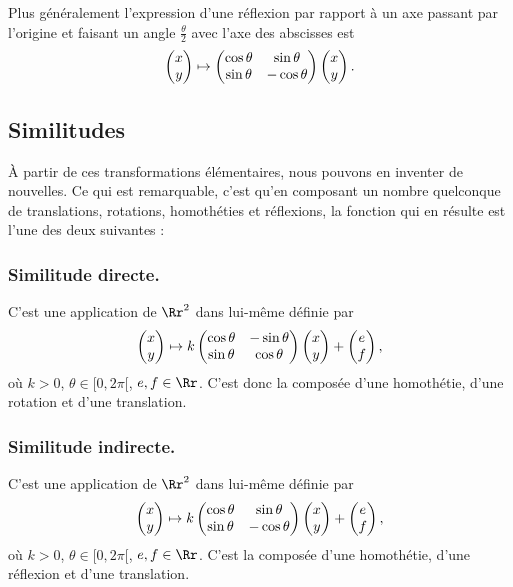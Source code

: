 \documentclass[11pt,class=report,crop=false]{standalone}
\begin{document}
Plus généralement l'expression d'une réflexion par rapport à un axe passant par l'origine et faisant un angle $\frac\theta2$ avec l'axe des abscisses est
$$\begin{pmatrix}x \\ y\end{pmatrix} \mapsto \begin{pmatrix}\cos \theta & \sin \theta \\ 
\sin\theta & -\cos \theta\\ \end{pmatrix}\begin{pmatrix}x \\ y\end{pmatrix}.$$



\subsection{Similitudes}

\`A partir de ces transformations élémentaires, nous pouvons en inventer de nouvelles.
Ce qui est remarquable, c'est qu'en composant un nombre quelconque de translations,
rotations, homothéties et réflexions, la fonction qui en résulte est l'une des deux suivantes :

\subsubsection*{Similitude directe.}
C'est une application de $\Rr^2$ dans lui-même définie 
par
$$\begin{pmatrix}x \\ y\end{pmatrix} \mapsto k\begin{pmatrix}\cos \theta & -\sin \theta \\ 
\sin\theta & \cos \theta\\ \end{pmatrix}\begin{pmatrix}x \\ y\end{pmatrix} + \begin{pmatrix}e \\ f\end{pmatrix},$$
où $k > 0$, $\theta \in[0,2\pi[$, $e, f \in \Rr$.
C'est donc la composée d'une homothétie, d'une rotation et d'une translation.


\subsubsection*{Similitude indirecte.}
C'est une application de $\Rr^2$ dans lui-même définie 
par
$$\begin{pmatrix}x \\ y\end{pmatrix} \mapsto k\begin{pmatrix}\cos \theta & \sin \theta \\ 
\sin\theta & -\cos \theta\\ \end{pmatrix}\begin{pmatrix}x \\ y\end{pmatrix} + \begin{pmatrix}e \\ f\end{pmatrix},$$
où $k > 0$, $\theta \in[0,2\pi[$, $e, f \in \Rr$.
C'est la composée d'une homothétie, d'une réflexion et d'une translation.
\end{document}

